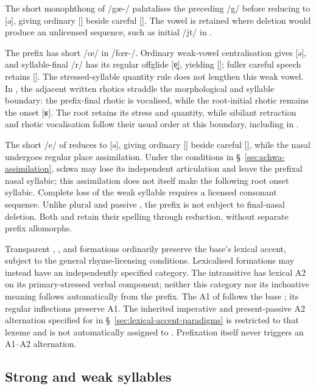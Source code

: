 The short monophthong of /gæ-/ palatalises the preceding /g/ before reducing to [ə], giving ordinary [] beside careful []. The vowel is retained where deletion would produce an unlicensed sequence, such as initial /jt/ in .

The prefix  has short /œ/ in /fœr-/. Ordinary weak-vowel centralisation gives [ə], and syllable-final /r/ has its regular offglide [ɐ̯], yielding []; fuller careful speech retains []. The stressed-syllable quantity rule does not lengthen this weak vowel. In , the adjacent written rhotics straddle the morphological and syllable boundary: the prefix-final rhotic is vocalised, while the root-initial rhotic remains the onset [ʁ]. The root retains its stress and quantity, while sibilant retraction and rhotic vocalisation follow their usual order at this boundary, including in .

The short /e/ of  reduces to [ə], giving ordinary [] beside careful [], while the nasal undergoes regular place assimilation. Under the conditions in \S~\ref{sec:schwa-assimilation}, schwa may lose its independent articulation and leave the prefixal nasal syllabic; this assimilation does not itself make the following root onset syllabic. Complete loss of the weak syllable requires a licensed consonant sequence. Unlike plural and passive , the prefix is not subject to final-nasal deletion. Both  and  retain their spelling through reduction, without separate prefix allomorphs.

Transparent , , and  formations ordinarily preserve the base's lexical accent, subject to the general rhyme-licensing conditions. Lexicalised formations may instead have an independently specified category. The intransitive  has lexical A2 on its primary-stressed verbal component; neither this category nor its inchoative meaning follows automatically from the prefix. The A1 of  follows the base ; its regular inflections preserve A1. The inherited imperative and present-passive A2 alternation specified for  in \S~\ref{sec:lexical-accent-paradigms} is restricted to that lexeme and is not automatically assigned to . Prefixation itself never triggers an A1--A2 alternation.

\subsection{Strong and weak syllables}

